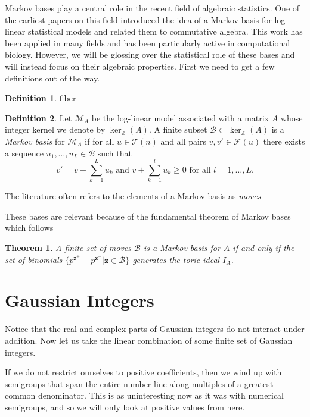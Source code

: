 \documentclass[11pt]{amsart}
\theoremstyle{plain}
\newtheorem{thm}{Theorem}
\theoremstyle{definition}
\newtheorem{defi}{Definition}
\begin{document}
Markov bases play a central role in the recent field of algebraic statistics.
One of the earliest papers on this field\cite{bernd} introduced the idea of a
Markov basis for log linear statistical models\cite{markstats} and related them
to commutative algebra. This work has been applied in many fields and has been
particularly active in computational biology. However, we will be glossing over
the statistical role of these bases and will instead focus on their algebraic
properties. First we need to get a few definitions out of the way.

\begin{defi}
  fiber
\end{defi}
\begin{defi}
\cite{bernd}
Let $\mathcal{M}_A$ be the log-linear model associated with a matrix $A$ whose integer kernel we denote by $\ker_\mathbb{Z}(A)$.
A finite subset $\mathcal{B}\subset\ker_{\mathbb{Z}}(A)$ is a \emph{Markov basis} for $\mathcal{M}_A$ if for all $u\in \mathcal{T}(n)$ and all pairs $v,v'\in \mathcal{F}(u)$ there exists a sequence $u_1,\dots,u_L\in  \mathcal{B}$ such that
\[v'=v+\sum\limits_{k=1}^L{u_k}\text{ and }v+\sum\limits_{k=1}^l{u_k}\ge 0\text{ for all }l=1,\dots,L.\]
\end{defi}

The literature often refers to the elements of a Markov basis as \emph{moves}\cite[p.16]{bernd}

These bases are relevant because of the fundamental theorem of Markov bases which follows
\begin{thm}
\cite[p.~54]{aoki}
A finite set of moves $\mathcal{B}$ is a Markov basis for $A$ if and only if the set of binomials $\{p^{\mathbf{z}^+}-p^{\mathbf{z}^-}|\mathbf{z}\in \mathcal{B}\}$ generates the toric ideal $I_A$.
\end{thm}
\section{Gaussian Integers}
Notice that the real and complex parts of Gaussian integers do not interact under addition. Now let us take the linear combination of some finite set of Gaussian integers.

If we do not restrict ourselves to positive coefficients, then we wind up with semigroups that span the entire number line along multiples of a greatest common denominator. This is as uninteresting now as it was with numerical semigroups, and so we will only look at positive values from here.
\end{document}
